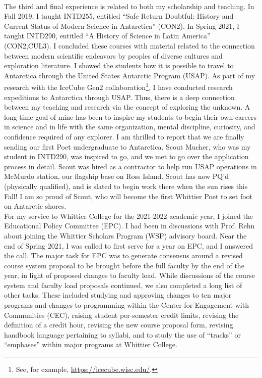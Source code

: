 \documentclass[../../main.tex]{subfiles}
\begin{document}
\\
\vspace{0.25cm}
The third and final experience is related to both my scholarship and teaching.  In Fall 2019, I taught INTD255, entitled ``Safe Return Doubtful: History and Current Status of Modern Science in Antarctica'' (CON2).  In Spring 2021, I taught INTD290, entitled ``A History of Science in Latin America'' (CON2,CUL3).  I concluded these courses with material related to the connection between modern scientific endeavors by peoples of diverse cultures and exploration literature.  I showed the students how it is possible to travel to Antarctica through the United States Antarctic Program (USAP).  As part of my research with the IceCube Gen2 collaboration\footnote{See, for example, \url{https://icecube.wisc.edu/}.}, I have conducted research expeditions to Antarctica through USAP.  Thus, there is a deep connection between my teaching and research via the concept of exploring the unknown.  A long-time goal of mine has been to inspire my students to begin their own careers in science and in life with the same organization, mental discipline, curiosity, and confidence required of any explorer.  I am thrilled to report that we are finally sending our first Poet undergraduate to Antarctica.  Scout Mucher, who was my student in INTD290, was inspired to go, and we met to go over the application process in detail.  Scout was hired as a contractor to help run USAP operations in McMurdo station, our flagship base on Ross Island.  Scout has now PQ'd (physically qualified), and is slated to begin work there when the sun rises this Fall!  I am so proud of Scout, who will become the first Whittier Poet to set foot on Antarctic shores.
\\
\vspace{0.25cm}
For my service to Whittier College for the 2021-2022 academic year, I joined the Educational Policy Committee (EPC).  I had been in discussions with Prof. Rehn about joining the Whittier Scholars Program (WSP) advisory board.  Near the end of Spring 2021, I was called to first serve for a year on EPC, and I answered the call.  The major task for EPC was to generate consensus around a revised course system proposal to be brought before the full faculty by the end of the year, in light of proposed changes to faculty load.  While discussions of the course system and faculty load proposals continued, we also completed a long list of other tasks.  These included studying and approving changes to ten major programs and changes to programming within the Center for Engagement with Communities (CEC), raising student per-semester credit limits, revising the definition of a credit hour, revising the new course proposal form, revising handbook language pertaining to syllabi, and to study the use of ``tracks'' or ``emphases'' within major programs at Whittier College.
\end{document}
